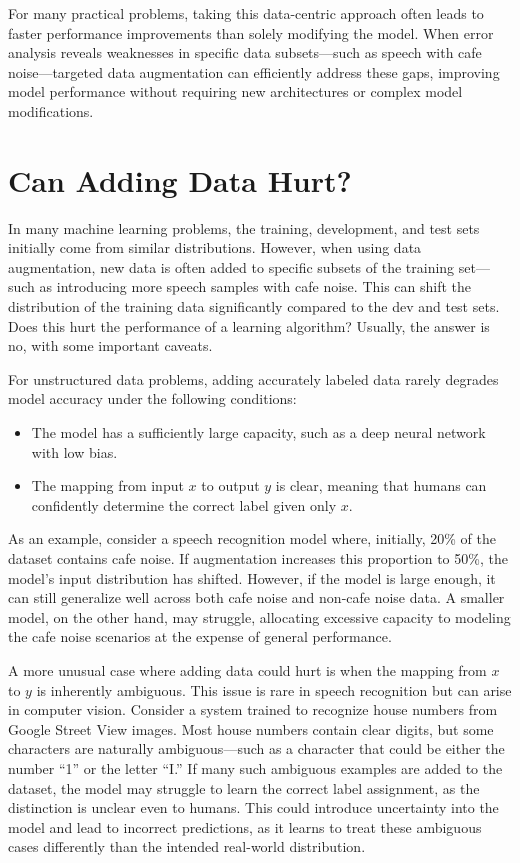 \documentclass[12pt,openany]{book}
\begin{document}
For many practical problems, taking this data-centric approach often leads to faster performance improvements than solely modifying the model. When error analysis reveals weaknesses in specific data subsets—such as speech with cafe noise—targeted data augmentation can efficiently address these gaps, improving model performance without requiring new architectures or complex model modifications.


\section{Can Adding Data Hurt?}

In many machine learning problems, the training, development, and test sets initially come from similar distributions. However, when using data augmentation, new data is often added to specific subsets of the training set—such as introducing more speech samples with cafe noise. This can shift the distribution of the training data significantly compared to the dev and test sets. Does this hurt the performance of a learning algorithm? Usually, the answer is no, with some important caveats. \newline

For unstructured data problems, adding accurately labeled data rarely degrades model accuracy under the following conditions:
\begin{itemize}
    \item The model has a sufficiently large capacity, such as a deep neural network with low bias.
    \item The mapping from input $x$ to output $y$ is clear, meaning that humans can confidently determine the correct label given only $x$.
\end{itemize}

As an example, consider a speech recognition model where, initially, 20\% of the dataset contains cafe noise. If augmentation increases this proportion to 50\%, the model’s input distribution has shifted. However, if the model is large enough, it can still generalize well across both cafe noise and non-cafe noise data. A smaller model, on the other hand, may struggle, allocating excessive capacity to modeling the cafe noise scenarios at the expense of general performance. \newline

A more unusual case where adding data could hurt is when the mapping from $x$ to $y$ is inherently ambiguous. This issue is rare in speech recognition but can arise in computer vision. Consider a system trained to recognize house numbers from Google Street View images. Most house numbers contain clear digits, but some characters are naturally ambiguous—such as a character that could be either the number “1” or the letter “I.” If many such ambiguous examples are added to the dataset, the model may struggle to learn the correct label assignment, as the distinction is unclear even to humans. This could introduce uncertainty into the model and lead to incorrect predictions, as it learns to treat these ambiguous cases differently than the intended real-world distribution. \newline
\end{document}
